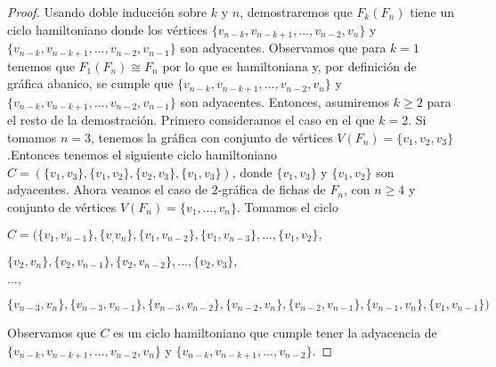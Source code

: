         
        \begin{proof}
            Usando doble inducci\'on sobre $k$ y $n$, demostraremos que $F_k(F_n)$
            tiene un ciclo hamiltoniano donde los v\'ertices $\{v_{n-k}, v_{n-k+1},
            \dots, v_{n-2}, v_n\}$ y $\{v_{n-k}, v_{n-k+1}, \dots, v_{n-2},
            v_{n-1}\}$ son adyacentes. Observamos que para $k =1$ tenemos que
            $F_1(F_n) \cong F_n$ por lo que es hamiltoniana y, por definici\'on de
            gr\'afica abanico, se cumple que $\{v_{n-k}, v_{n-k+1}, \dots, v_{n-2},
            v_n\}$ y $\{v_{n-k}, v_{n-k+1}, \dots, v_{n-2}, v_{n-1}\}$ son
            adyacentes. Entonces, asumiremos $k \geq 2$ para el resto de la
            demostraci\'on. Primero consideramos el caso en el que $k =2$. Si
            tomamos $n = 3$, tenemos la gr\'afica con conjunto de v\'ertices
            $V(F_n)=\{v_1, v_2, v_3\}$ .Entonces tenemos el siguiente ciclo
            hamiltoniano $C= (\{v_1,v_3\},\{v_1,v_2\},\{v_2,v_3\}, \{v_1,v_3\})$,
            donde $\{v_1, v_3\}$ y $\{v_1, v_2\}$ son adyacentes. Ahora veamos el
            caso de $2$-gr\'afica de fichas de $F_n$, con $n \geq 4$ y conjunto de
            v\'ertices $V(F_n)=\{v_1,\dots, v_n\}$. Tomamos el ciclo
    
            $C = (\{v_1, v_{n-1}\},\{v_, v_n\},\{v_1, v_{n-2}\}, \{v_1, v_{n-3}\},
            \dots, \{v_1, v_2\},$
            
            $\{v_2, v_n\}, \{v_2, v_{n-1}\}, \{v_2, v_{n-2}\},
            \dots, \{v_2, v_3\},$
    
            $ \dots,$
    
            $\{v_{n-3},v_n\}, \{v_{n-3}, v_{n-1}\},\{v_{n-3},v_{n-2}\}, \{v_{n-2},
            v_n\},\{v_{n-2}, v_{n-1}\}, \{v_{n-1}, v_n\}, \{v_1, v_{n-1}\})$
    
            Observamos que $C$ es un ciclo hamiltoniano que cumple tener la
            adyacencia de  $\{v_{n-k}, v_{n-k+1}, \dots, v_{n-2}, v_n\}$ y
            $\{v_{n-k}, v_{n-k+1}, \dots, v_{n-2}\}$. 
    

\end{proof}
